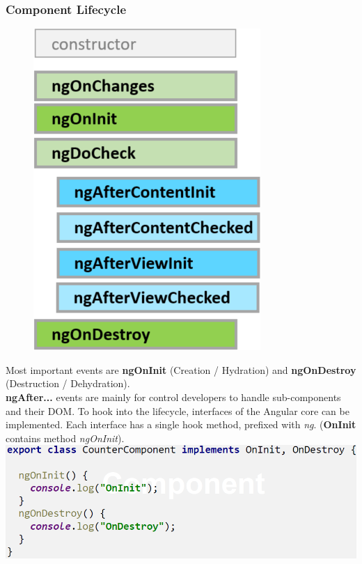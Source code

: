 \subsubsection{Component Lifecycle}
\begingroup
\setlength{\intextsep}{0pt}
\setlength{\columnsep}{20pt}
\begin{figure}
    \centering
    \includegraphics[width=0.7\linewidth]{img/angular_component_lifecycle.png}
\end{figure}
Most important events are \textbf{ngOnInit} (Creation / Hydration) and \textbf{ngOnDestroy} (Destruction / Dehydration).\\
\textbf{ngAfter...} events are mainly for control developers to handle sub-components and their DOM.
To hook into the lifecycle, interfaces of the Angular core can be implemented.
Each interface has a single hook method, prefixed with \textit{ng}. (\textbf{OnInit} contains method \textit{ngOnInit}).\\
\includegraphics[width=\linewidth]{img/angular_component_lifecycle2.png}

